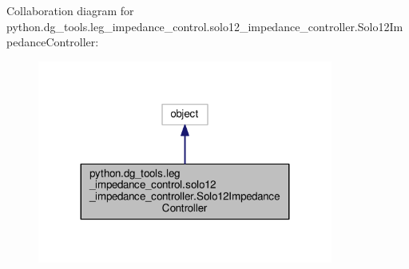 Collaboration diagram for python.\+dg\+\_\+tools.\+leg\+\_\+impedance\+\_\+control.\+solo12\+\_\+impedance\+\_\+controller.\+Solo12\+Impedance\+Controller\+:
\nopagebreak
\begin{figure}[H]
\begin{center}
\leavevmode
\includegraphics[width=275pt]{classpython_1_1dg__tools_1_1leg__impedance__control_1_1solo12__impedance__controller_1_1Solo12ImpedanceController__coll__graph}
\end{center}
\end{figure}
